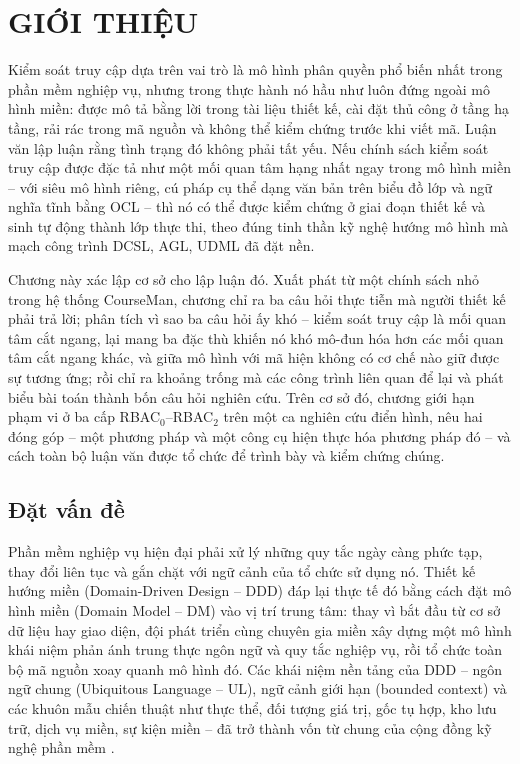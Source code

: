 \chapter{GIỚI THIỆU}
\label{ch:gioi-thieu}

Kiểm soát truy cập dựa trên vai trò là mô hình phân quyền phổ biến nhất trong phần mềm nghiệp vụ, nhưng trong thực hành nó hầu như luôn đứng ngoài mô hình miền: được mô tả bằng lời trong tài liệu thiết kế, cài đặt thủ công ở tầng hạ tầng, rải rác trong mã nguồn và không thể kiểm chứng trước khi viết mã. Luận văn lập luận rằng tình trạng đó không phải tất yếu. Nếu chính sách kiểm soát truy cập được đặc tả như một mối quan tâm hạng nhất ngay trong mô hình miền -- với siêu mô hình riêng, cú pháp cụ thể dạng văn bản trên biểu đồ lớp và ngữ nghĩa tĩnh bằng OCL -- thì nó có thể được kiểm chứng ở giai đoạn thiết kế và sinh tự động thành lớp thực thi, theo đúng tinh thần kỹ nghệ hướng mô hình mà mạch công trình DCSL, AGL, UDML đã đặt nền.

Chương này xác lập cơ sở cho lập luận đó. Xuất phát từ một chính sách nhỏ trong hệ thống CourseMan, chương chỉ ra ba câu hỏi thực tiễn mà người thiết kế phải trả lời; phân tích vì sao ba câu hỏi ấy khó -- kiểm soát truy cập là mối quan tâm cắt ngang, lại mang ba đặc thù khiến nó khó mô-đun hóa hơn các mối quan tâm cắt ngang khác, và giữa mô hình với mã hiện không có cơ chế nào giữ được sự tương ứng; rồi chỉ ra khoảng trống mà các công trình liên quan để lại và phát biểu bài toán thành bốn câu hỏi nghiên cứu. Trên cơ sở đó, chương giới hạn phạm vi ở ba cấp RBAC$_0$--RBAC$_2$ trên một ca nghiên cứu điển hình, nêu hai đóng góp -- một phương pháp và một công cụ hiện thực hóa phương pháp đó -- và cách toàn bộ luận văn được tổ chức để trình bày và kiểm chứng chúng.

\section{Đặt vấn đề}
\label{sec:dat-van-de}

Phần mềm nghiệp vụ hiện đại phải xử lý những quy tắc ngày càng phức tạp, thay đổi liên tục và gắn chặt với ngữ cảnh của tổ chức sử dụng nó. Thiết kế hướng miền (Domain-Driven Design -- DDD) \cite{evans2003} đáp lại thực tế đó bằng cách đặt mô hình miền (Domain Model -- DM) vào vị trí trung tâm: thay vì bắt đầu từ cơ sở dữ liệu hay giao diện, đội phát triển cùng chuyên gia miền xây dựng một mô hình khái niệm phản ánh trung thực ngôn ngữ và quy tắc nghiệp vụ, rồi tổ chức toàn bộ mã nguồn xoay quanh mô hình đó. Các khái niệm nền tảng của DDD -- ngôn ngữ chung (Ubiquitous Language -- UL), ngữ cảnh giới hạn (bounded context) và các khuôn mẫu chiến thuật như thực thể, đối tượng giá trị, gốc tụ hợp, kho lưu trữ, dịch vụ miền, sự kiện miền -- đã trở thành vốn từ chung của cộng đồng kỹ nghệ phần mềm \cite{vernon2013}.

